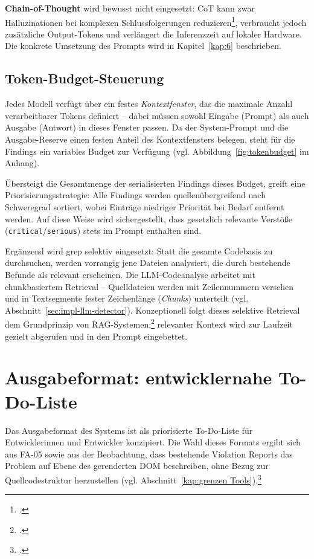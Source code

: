 \textbf{Chain-of-Thought} wird bewusst nicht eingesetzt: \ac{CoT} kann zwar Halluzinationen bei komplexen Schlussfolgerungen reduzieren\footcite[Vgl.][S.~2]{wei2022chainofthought}, verbraucht jedoch zusätzliche Output-Tokens und verlängert die Inferenzzeit auf lokaler Hardware. Die konkrete Umsetzung des Prompts wird in Kapitel~\ref{kap:6} beschrieben.

\subsection{Token-Budget-Steuerung}

Jedes Modell verfügt über ein festes \textit{Kontextfenster}, das die maximale Anzahl verarbeitbarer Tokens definiert -- dabei müssen sowohl Eingabe (Prompt) als auch Ausgabe (Antwort) in dieses Fenster passen. Da der System-Prompt und die Ausgabe-Reserve einen festen Anteil des Kontextfensters belegen, steht für die Findings ein variables Budget zur Verfügung (vgl. Abbildung~\ref{fig:tokenbudget} im Anhang).

Übersteigt die Gesamtmenge der serialisierten Findings dieses Budget, greift eine Priorisierungsstrategie: Alle Findings werden quellenübergreifend nach Schweregrad sortiert, wobei Einträge niedriger Priorität bei Bedarf entfernt werden. Auf diese Weise wird sichergestellt, dass gesetzlich relevante Verstöße (\texttt{critical}/\texttt{serious}) stets im Prompt enthalten sind.

Ergänzend wird grep selektiv eingesetzt: Statt die gesamte Codebasis zu durchsuchen, werden vorrangig jene Dateien analysiert, die durch bestehende Befunde als relevant erscheinen. Die \ac{LLM}-Codeanalyse arbeitet mit chunkbasiertem Retrieval -- Quelldateien werden mit Zeilennummern versehen und in Textsegmente fester Zeichenlänge (\textit{Chunks}) unterteilt (vgl. Abschnitt~\ref{sec:impl-llm-detector}). Konzeptionell folgt dieses selektive Retrieval dem Grundprinzip von \ac{RAG}-Systemen:\footcite[Vgl.][S.~1--2]{lewisRetrievalAugmentedGenerationKnowledgeIntensive2021} relevanter Kontext wird zur Laufzeit gezielt abgerufen und in den Prompt eingebettet.

\section{Ausgabeformat: entwicklernahe To-Do-Liste}
\label{sec:ausgabeformat}

Das Ausgabeformat des Systems ist als priorisierte To-Do-Liste für Entwicklerinnen und Entwickler konzipiert. Die Wahl dieses Formats ergibt sich aus \ac{FA}-05 sowie aus der Beobachtung, dass bestehende Violation Reports das Problem auf Ebene des gerenderten \ac{DOM} beschreiben, ohne Bezug zur Quellcodestruktur herzustellen (vgl. Abschnitt~\ref{kap:grenzen Tools}).\footcite[Vgl.][]{fathallah_accessguru_2025}

